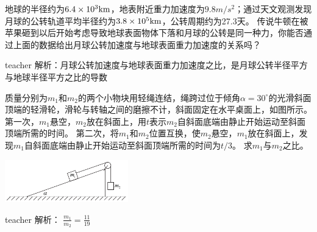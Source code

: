\begin{example}
	地球的半径约为$6.4\times 10^{3}{\rm{km}}$，地表附近重力加速度为$9.8\unit{m/s^2}$；通过天文观测发现月球的公转轨道平均半径约为$3.8\times 10^{5}{\rm{km}}$，公转周期约为27.3天。
	传说牛顿在被苹果砸到以后开始考虑导致地球表面物体下落和月球的公转是同一种力，你能否通过上面的数据给出月球公转加速度与地球表面重力加速度的关系吗？
	\begin{taggedblock}{teacher}
		\newline
		解析：月球公转加速度与地球表面重力加速度之比，是月球公转半径平方与地球半径平方之比的导数
	\end{taggedblock}
\end{example}



\begin{example}
质量分别为$m_1$和$m_2$的两个小物块用轻绳连结，绳跨过位于倾角$\alpha=30^\circ$的光滑斜面顶端的轻滑轮，滑轮与转轴之间的磨擦不计，斜面固定在水平桌面上，如图所示。
第一次，$m_1$悬空，$m_2$放在斜面上，用$t$表示$m_2$自斜面底端由静止开始运动至斜面顶端所需的时间。
第二次，将$m_1$和$m_2$位置互换，使$m_2$悬空，$m_1$放在斜面上，发现$m_1$自斜面底端由静止开始运动至斜面顶端所需的时间为$t/3$。
求$m_1$与$m_2$之比。
\begin{flushright}
\includegraphics[width = 0.4\textwidth]{images/newton-5.pdf} 
\end{flushright}

\begin{taggedblock}{teacher}
\noindent
解析：
$\frac{m_1}{m_2}=\frac{11}{19}$
\end{taggedblock}
\end{example}




